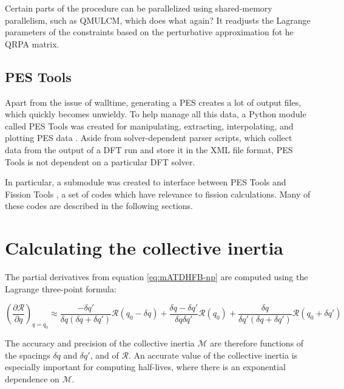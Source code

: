 Certain parts of the procedure can be parallelized using shared-memory parallelism, such as QMULCM, which does what again? It readjusts the Lagrange parameters of the constraints based on the perturbative approximation fot he QRPA matrix.

\subsection{PES Tools}
Apart from the issue of walltime, generating a PES creates a lot of output files, which quickly becomes unwieldy. To help manage all this data, a Python module called PES Tools was created for manipulating, extracting, interpolating, and plotting PES data \cite{PES_tools}. Aside from solver-dependent parser scripts, which collect data from the output of a DFT run and store it in the XML file format, PES Tools is not dependent on a particular DFT solver.

In particular, a submodule was created to interface between PES Tools and Fission Tools \cite{fission_tools}, a set of codes which have relevance to fission calculations. Many of these codes are described in the following sections.

\section{Calculating the collective inertia}
The partial derivatives from equation \ref{eq:mATDHFB-np} are computed using the Lagrange three-point formula:

\begin{equation}\label{eq:finite-diffs}
\left(\frac{\partial \mathcal{R}}{\partial q}\right)_{q=q_0} \approx 
    \frac{-\delta q'}{\delta q \left(\delta q + \delta q'\right)}\mathcal{R}(q_0-\delta q) + 
    \frac{\delta q - \delta q'}{\delta q \delta q'}\mathcal{R}(q_0) + 
    \frac{\delta q}{\delta q' \left(\delta q + \delta q'\right)}\mathcal{R}(q_0+\delta q')
\end{equation}

The accuracy and precision of the collective inertia $\mathcal{M}$ are therefore functions of the spacings $\delta q$ and $\delta q'$, and of $\mathcal{R}$. An accurate value of the collective inertia is especially important for computing half-lives, where there is an exponential dependence on $\mathcal{M}$.


